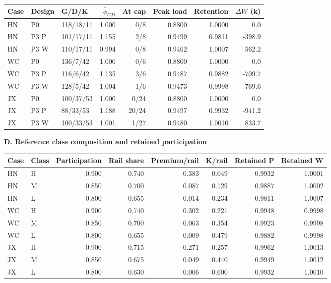\begin{table}[htbp]
\begin{minipage}{.95\textwidth}
\begin{tabular*}{\linewidth}{@{\extracolsep{\fill}}lllrrrrr@{}}\toprule
Case & Design & G/D/K & $\bar\phi_{GD}$ & At cap & Peak load & Retention & $\Delta W$ (k) \\
\midrule
HN & P0 & 118/18/11 & 1.000 & 0/8 & 0.8800 & 1.0000 & 0.0 \\
HN & P3 P & 101/17/11 & 1.155 & 2/8 & 0.9499 & 0.9811 & -398.9 \\
HN & P3 W & 110/17/11 & 0.994 & 0/8 & 0.9462 & 1.0007 & 562.2 \\
WC & P0 & 136/7/42 & 1.000 & 0/6 & 0.8800 & 1.0000 & 0.0 \\
WC & P3 P & 116/6/42 & 1.135 & 3/6 & 0.9487 & 0.9882 & -709.7 \\
WC & P3 W & 128/5/42 & 1.004 & 1/6 & 0.9473 & 0.9998 & 769.6 \\
JX & P0 & 100/37/53 & 1.000 & 0/24 & 0.8800 & 1.0000 & 0.0 \\
JX & P3 P & 88/33/53 & 1.188 & 20/24 & 0.9497 & 0.9932 & -941.2 \\
JX & P3 W & 100/33/53 & 1.001 & 1/27 & 0.9480 & 1.0010 & 833.7 \\
\bottomrule\end{tabular*}\par\medskip
\par\noindent\textbf{D. Reference class composition and retained participation}\par\smallskip
\begin{tabular*}{\linewidth}{@{\extracolsep{\fill}}llrrrrrr@{}}\toprule
Case & Class & Participation & Rail share & Premium/rail & K/rail & Retained P & Retained W \\
\midrule
HN & H & 0.900 & 0.740 & 0.383 & 0.049 & 0.9932 & 1.0001 \\
HN & M & 0.850 & 0.700 & 0.087 & 0.129 & 0.9887 & 1.0002 \\
HN & L & 0.800 & 0.655 & 0.014 & 0.234 & 0.9811 & 1.0007 \\
WC & H & 0.900 & 0.740 & 0.302 & 0.221 & 0.9948 & 0.9998 \\
WC & M & 0.850 & 0.700 & 0.063 & 0.354 & 0.9923 & 0.9998 \\
WC & L & 0.800 & 0.655 & 0.009 & 0.479 & 0.9882 & 0.9998 \\
JX & H & 0.900 & 0.715 & 0.271 & 0.257 & 0.9962 & 1.0013 \\
JX & M & 0.850 & 0.675 & 0.049 & 0.440 & 0.9949 & 1.0012 \\
JX & L & 0.800 & 0.630 & 0.006 & 0.600 & 0.9932 & 1.0010 \\

\end{tabular*}
\end{minipage}
\end{table}
